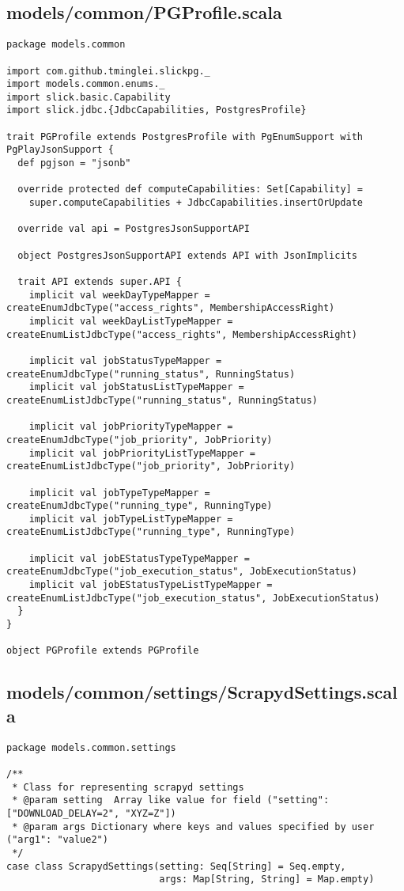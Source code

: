 \subsection{models/common/PGProfile.scala}
\begin{lstlisting}
package models.common

import com.github.tminglei.slickpg._
import models.common.enums._
import slick.basic.Capability
import slick.jdbc.{JdbcCapabilities, PostgresProfile}

trait PGProfile extends PostgresProfile with PgEnumSupport with PgPlayJsonSupport {
  def pgjson = "jsonb"

  override protected def computeCapabilities: Set[Capability] =
    super.computeCapabilities + JdbcCapabilities.insertOrUpdate

  override val api = PostgresJsonSupportAPI

  object PostgresJsonSupportAPI extends API with JsonImplicits

  trait API extends super.API {
    implicit val weekDayTypeMapper = createEnumJdbcType("access_rights", MembershipAccessRight)
    implicit val weekDayListTypeMapper = createEnumListJdbcType("access_rights", MembershipAccessRight)

    implicit val jobStatusTypeMapper = createEnumJdbcType("running_status", RunningStatus)
    implicit val jobStatusListTypeMapper = createEnumListJdbcType("running_status", RunningStatus)

    implicit val jobPriorityTypeMapper = createEnumJdbcType("job_priority", JobPriority)
    implicit val jobPriorityListTypeMapper = createEnumListJdbcType("job_priority", JobPriority)

    implicit val jobTypeTypeMapper = createEnumJdbcType("running_type", RunningType)
    implicit val jobTypeListTypeMapper = createEnumListJdbcType("running_type", RunningType)

    implicit val jobEStatusTypeTypeMapper = createEnumJdbcType("job_execution_status", JobExecutionStatus)
    implicit val jobEStatusTypeListTypeMapper = createEnumListJdbcType("job_execution_status", JobExecutionStatus)
  }
}

object PGProfile extends PGProfile\end{lstlisting}
\subsection{models/common/settings/ScrapydSettings.scala}
\begin{lstlisting}
package models.common.settings

/**
 * Class for representing scrapyd settings
 * @param setting  Array like value for field ("setting": ["DOWNLOAD_DELAY=2", "XYZ=Z"])
 * @param args Dictionary where keys and values specified by user ("arg1": "value2")
 */
case class ScrapydSettings(setting: Seq[String] = Seq.empty,
                           args: Map[String, String] = Map.empty)
\end{lstlisting}
